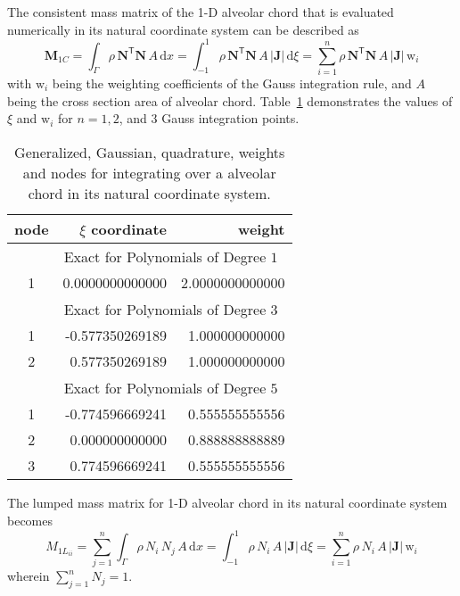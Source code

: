 The consistent mass matrix of the 1-D alveolar chord that is evaluated numerically in its natural coordinate system can be described as
\begin{equation}
    \mathbf{M}_{1C} = \int_{\Gamma} \rho \, \mathbf{N}^{\mathsf{T}} \mathbf{N} \, A \, \mathrm{d} x  = \int_{-1}^{1} \rho \, \mathbf{N}^{\mathsf{T}} \mathbf{N}\, A \, |\mathbf{J}|\,  \mathrm{d} \xi =  \sum_{i=1}^{n}  \rho  \, \mathbf{N}^{\mathsf{T}} \mathbf{N} \, A\, |\mathbf{J}| \, \mathrm{w}_i
\end{equation}
 with $\mathrm{w}_i$ being the  weighting coefficients of the Gauss integration rule, and $A$ being the cross section area of alveolar chord. Table~\ref{tabQuadrature1D} demonstrates the values of $\xi$ and $\mathrm{w}_i$ for $n = 1, 2$, and $3$ Gauss integration points.
\begin{table}
    \centering
    \begin{tabular}{|c|rr|}
        \hline
        node & \centering $\xi$ coordinate \phantom{12}  & 
        weight \phantom{12} \\ \hline
        & \multicolumn{2}{|c|}{Exact for Polynomials of Degree $1^{\phantom{|^|}}$} \\ 
        \hline
        1 & 0.0000000000000 & 2.0000000000000 \\ 
        \hline
        & \multicolumn{2}{|c|}{Exact for Polynomials of Degree $3^{\phantom{|^|}}$} \\ \hline
        1 & -0.577350269189 & 1.000000000000\\
        2 & 0.577350269189 & 1.000000000000\\ 
        \hline
        & \multicolumn{2}{|c|}{Exact for Polynomials of Degree $5^{\phantom{|^|}}$} \\ \hline
        1 & -0.774596669241 & 0.555555555556 \\
        2 & 0.000000000000 & 0.888888888889\\
        3 & 0.774596669241 & 0.555555555556\\ 
        \hline
    \end{tabular}
    \caption{Generalized, Gaussian, quadrature, weights and nodes for integrating over a alveolar chord in its natural coordinate system.}
    \label{tabQuadrature1D}
\end{table}

The lumped mass matrix for 1-D alveolar chord in its natural coordinate system becomes 
\begin{equation}
{M}_{1L_{ii}} = \sum_{j=1}^n \int_{\Gamma} \rho \, N_i \, N_j \, A \, \mathrm{d} x  = \int_{-1}^{1} \rho \, N_i\, A \, |\mathbf{J}|\,  \mathrm{d} \xi =  \sum_{i=1}^n  \rho  \, N_i\, A\, |\mathbf{J}| \, \mathrm{w}_i
\end{equation}
wherein $\sum_{j=1}^n N_j = 1$. 

